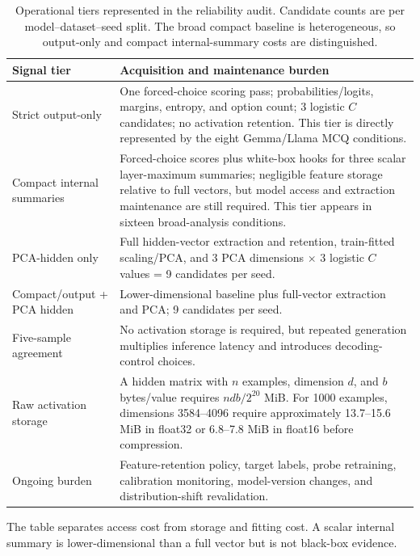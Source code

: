 \begin{table}[t]
\centering
\small
\caption{Operational tiers represented in the reliability audit. Candidate counts are per model--dataset--seed split. The broad compact baseline is heterogeneous, so output-only and compact internal-summary costs are distinguished.}
\label{tab:operational-cost-quantification}
\begin{threeparttable}
\begin{tabularx}{\textwidth}{p{}X}
\toprule
Signal tier & Acquisition and maintenance burden \\
\midrule
Strict output-only & One forced-choice scoring pass; probabilities/logits, margins, entropy, and option count; 3 logistic $C$ candidates; no activation retention. This tier is directly represented by the eight Gemma/Llama MCQ conditions. \\
Compact internal summaries & Forced-choice scores plus white-box hooks for three scalar layer-maximum summaries; negligible feature storage relative to full vectors, but model access and extraction maintenance are still required. This tier appears in sixteen broad-analysis conditions. \\
PCA-hidden only & Full hidden-vector extraction and retention, train-fitted scaling/PCA, and $3$ PCA dimensions $\times$ $3$ logistic $C$ values = 9 candidates per seed. \\
Compact/output + PCA hidden & Lower-dimensional baseline plus full-vector extraction and PCA; 9 candidates per seed. \\
Five-sample agreement & No activation storage is required, but repeated generation multiplies inference latency and introduces decoding-control choices. \\
Raw activation storage & A hidden matrix with $n$ examples, dimension $d$, and $b$ bytes/value requires $ndb/2^{20}$ MiB. For 1000 examples, dimensions 3584--4096 require approximately 13.7--15.6 MiB in float32 or 6.8--7.8 MiB in float16 before compression. \\
Ongoing burden & Feature-retention policy, target labels, probe retraining, calibration monitoring, model-version changes, and distribution-shift revalidation. \\
\bottomrule
\end{tabularx}
\begin{tablenotes}[flushleft]\footnotesize\item The table separates access cost from storage and fitting cost. A scalar internal summary is lower-dimensional than a full vector but is not black-box evidence.\end{tablenotes}
\end{threeparttable}
\end{table}

